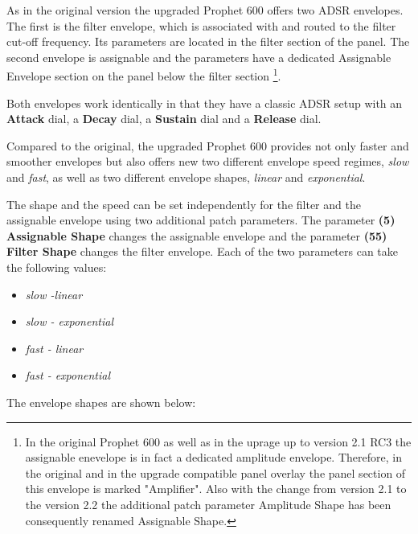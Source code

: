 As in the original version the upgraded Prophet 600 offers two ADSR envelopes. The first is the filter envelope, which is associated with and routed to the filter cut-off frequency. Its parameters are located in the filter section of the panel. The second envelope is assignable and the parameters have a dedicated Assignable Envelope section on the panel below the filter section \footnote{In the original Prophet 600 as well as in the uprage up to version 2.1 RC3 the assignable enevelope is in fact a dedicated amplitude envelope. Therefore, in the original and in the upgrade compatible panel overlay the panel section of this envelope is marked "Amplifier". Also with the change from version 2.1 to the version 2.2 the additional patch parameter Amplitude Shape has been consequently renamed Assignable Shape.}.

Both envelopes work identically in that they have a classic ADSR setup with an \textbf{Attack} dial, a \textbf{Decay} dial, a \textbf{Sustain} dial and a \textbf{Release} dial. 

\begin{center}
\end{center}

Compared to the original, the upgraded Prophet 600 provides not only faster and smoother envelopes but also offers new two different envelope speed regimes, \textit{slow} and \textit{fast}, as well as two different envelope shapes, \textit{linear} and \textit{exponential}.

The shape and the speed can be set independently for the filter and the assignable envelope using two additional patch parameters. The parameter \textbf{(5) Assignable Shape} changes the assignable envelope and the parameter \textbf{(55) Filter Shape} changes the filter envelope. Each of the two parameters can take the following values:

\begin{itemize}
  \setlength\itemsep{0cm}
  \item \textit{slow -linear}
  \item \textit{slow - exponential}
  \item \textit{fast - linear}
  \item \textit{fast - exponential}
\end{itemize}
 
 The envelope shapes are shown below:
 
